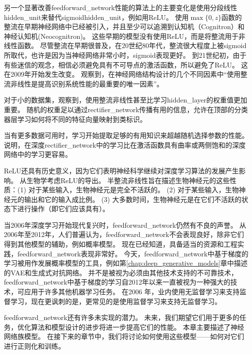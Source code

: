 另一个显著改善\gls{feedforward_network}性能的算法上的主要变化是使用分段线性\gls{hidden_unit}来替代\gls{sigmoid}\gls{hidden_unit}，例如用\gls{ReLU}。
使用$\max\{0, z\}$函数的整流在早期神经网络中已经被引入，并且至少可以追溯到认知机（Cognitron）和神经认知机(Neocognitron)\citep{Fukushima75,Fukushima80}。
这些早期的模型没有使用\gls{ReLU}，而是将整流用于非线性函数。
尽管整流在早期很普及，在20世纪80年代，整流很大程度上被\gls{sigmoid}所取代，也许是因为当神经网络非常小时，\gls{sigmoid}表现更好。
到21世纪初，由于有些迷信的观念，相信必须避免具有不可导点的激活函数，所以避免了\gls{ReLU}。
这在2009年开始发生改变。
\cite{Jarrett-ICCV2009-small}观察到，在神经网络结构设计的几个不同因素中``使用整流非线性是提高识别系统性能的最重要的唯一因素''。

对于小的数据集，\cite{Jarrett-ICCV2009-small}观察到，使用整流非线性甚至比学习\gls{hidden_layer}的权重值更加重要。
随机的权重足以通过\gls{rectifier_network}传播有用的信息，允许在顶部的分类器层学习如何将不同的特征向量映射到类标识。

当有更多数据可用时，学习开始提取足够的有用知识来超越随机选择参数的性能。
\cite{Glorot+al-AI-2011-small}说明，在深度\gls{rectifier_network}中的学习比在激活函数具有曲率或两侧饱和的深度网络中的学习更容易。

\gls{ReLU}还具有历史意义，因为它们表明神经科学继续对深度学习算法的发展产生影响。
\cite{Glorot+al-AI-2011-small}从生物学考虑\gls{ReLU}的导出。
半整流非线性旨在描述生物神经元的这些性质：(1) 对于某些输入，生物神经元是完全不活跃的。
(2) 对于某些输入，生物神经元的输出和它的输入成比例。
(3) 大多数时间，生物神经元是在它们不活跃的状态下进行操作（即它们应该具有）。
  
  
当2006年深度学习开始现代复兴时，\gls{feedforward_network}仍然有不良的声誉。
从2006年至2012年，人们普遍认为，\gls{feedforward_network}不会表现良好，除非它们得到其他模型的辅助，例如概率模型。
现在已经知道，具备适当的资源和工程实践，\gls{feedforward_network}表现非常好。
今天，\gls{feedforward_network}中基于梯度的学习被用作发展概率模型的工具，例如第\ref{chap:deep_generative_models}章中描述的\gls{VAE}和生成式对抗网络。
并不是被视为必须由其他技术支持的不可靠技术，\gls{feedforward_network}中基于梯度的学习自2012年以来一直被视为一种强大的技术，可应用于许多其他机器学习任务。
在2006 年，业内使用无监督学习来支持监督学习，现在更讽刺的是，更常见的是使用监督学习来支持无监督学习。

\gls{feedforward_network}还有许多未实现的潜力。
未来，我们期望它们用于更多的任务，优化算法和模型设计的进步将进一步提高它们的性能。
本章主要描述了神经网络族模型。
在接下来的章节中，我们将讨论如何使用这些模型——如何对它们进行正则化和训练。

  
  
